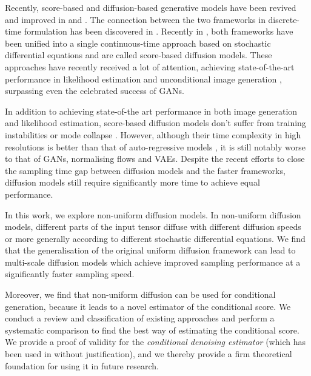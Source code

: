 Recently, score-based \cite{hyvarinen2005score_original} and diffusion-based  \cite{sohldickstein2015diffusion_original} generative models have been revived and improved in \cite{song2020generative_score} and \cite{ho2020denoising}.  
The connection between the two frameworks in discrete-time formulation has been discovered in \cite{vincent2011connection}. 
Recently in \cite{song2021sde}, both frameworks have been unified into a single continuous-time approach based on stochastic differential equations \cite{song2021sde} and are called score-based diffusion models. 
These approaches have recently received a lot of attention, achieving state-of-the-art performance in likelihood estimation \cite{song2021sde} and unconditional image generation \cite{dhariwal2021diffusion_beats_gans}, surpassing even the celebrated success of GANs.

In addition to achieving state-of-the art performance in both image generation and likelihood estimation, score-based diffusion models don't suffer from training instabilities or mode collapse \cite{dhariwal2021diffusion_beats_gans, song2021sde}. However, although their time complexity in high resolutions is better than that of auto-regressive models \cite{dhariwal2021diffusion_beats_gans}, it is still notably worse to that of GANs, normalising flows and VAEs. Despite the recent efforts to close the sampling time gap between diffusion models and the faster frameworks, diffusion models still require significantly more time to achieve equal performance.

In this work, we explore non-uniform diffusion models. In non-uniform diffusion models, different parts of the input tensor diffuse with different diffusion speeds or more generally according to different stochastic differential equations. We find that the generalisation of the original uniform diffusion framework can lead to multi-scale diffusion models which achieve improved sampling performance at a significantly faster sampling speed.

Moreover, we find that non-uniform diffusion can be used for conditional generation, because it leads to a novel estimator of the conditional score. We conduct a review and classification of existing approaches and perform a systematic comparison to find the best way of estimating the conditional score. We provide a proof of validity for the \textit{conditional denoising estimator} (which has been used in \cite{saharia2021sr3,tashiro2021csdi} without justification), and we thereby provide a firm theoretical foundation for using it in future research.

